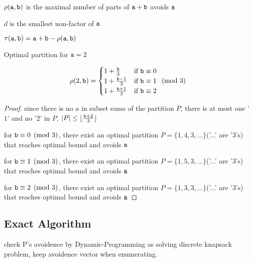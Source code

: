 \begin{definition}
$\rho(\mathtt{a},\mathtt{b})$ is the maximal number of parts of $\mathtt{a}+\mathtt{b}$ avoids $\mathtt{a}$

$d$ is the smallest non-factor of $\mathtt{a}$
\end{definition}

\begin{remark}
$\tau(\mathtt{a},\mathtt{b})=\mathtt{a}+\mathtt{b}-\rho(\mathtt{a},\mathtt{b})$
\end{remark}

\begin{theorem}
Optimal partition for $\mathtt{a}=2$

\[
 \rho(2,\mathtt{b}) =
   \begin{cases}
     1+\frac{\mathtt{b}}{3}   &\mbox{if }\mathtt{b}\equiv0\\
     1+\frac{\mathtt{b}-1}{3} &\mbox{if }\mathtt{b}\equiv1\\
     1+\frac{\mathtt{b}+1}{3} &\mbox{if }\mathtt{b}\equiv2
   \end{cases}
   \pmod{3}
\]
\end{theorem}

\begin{proof}
	since there is no $a$ in subset sums of the partition $P$, there is at most one '$1$' and no '$2$' in $P$, $|P|\leq \lfloor\frac{\mathtt{b}+2}{3}\rfloor$

	for $\mathtt{b}\equiv0\pmod{3}$, there exist an optimal partition $P=\{1,4,3,...\}$('...' are '$3$'s) that reaches optimal bound and avoids $\mathtt{a}$

	for $\mathtt{b}\equiv1\pmod{3}$, there exist an optimal partition $P=\{1,5,3,...\}$('...' are '$3$'s) that reaches optimal bound and avoids $\mathtt{a}$

	for $\mathtt{b}\equiv2\pmod{3}$, there exist an optimal partition $P=\{1,3,3,...\}$('...' are '$3$'s) that reaches optimal bound and avoids $\mathtt{a}$

\end{proof}


\subsection{Exact Algorithm}

\begin{algorithmic}
     
    \ENDIF
  \ENDFOR
\end{algorithmic}
check P's avoidence by Dynamic-Programming as solving discrete knapsack problem, keep avoidence vector when enumerating.

